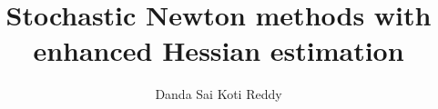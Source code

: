 \documentclass[oneside,12pt]{./thesisStyle/IIScthesisPSnPDF}
\begin{document}
\title{Stochastic Newton methods with enhanced Hessian estimation}	%

\submitdate{\monthyeardate\today} 
\mscengg
\author{Danda Sai Koti Reddy}



\maketitle


% 
% 
% 
% 
% 
% 
% 
% 
% 
		
\end{document}
